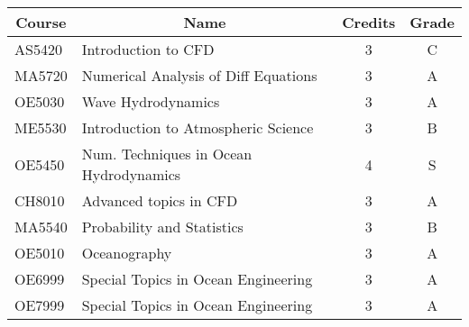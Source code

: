 \begin{tabular}{|l|l|c|c|}
\hline
\multicolumn{1}{|c|}{\textbf{Course }} & \multicolumn{1}{c|}{\textbf{Name}} & \textbf{Credits} & \textbf{Grade} \\ \hline
AS5420 & Introduction to CFD & 3 & C \\ \hline
MA5720 & Numerical Analysis of Diff Equations & 3 & A \\ \hline
OE5030 & Wave Hydrodynamics & 3 & A \\ \hline
ME5530 & Introduction to Atmospheric Science & 3 & B \\ \hline
OE5450 & Num. Techniques in Ocean Hydrodynamics & 4 & S \\ \hline
CH8010 & Advanced topics in CFD & 3 & A \\ \hline
MA5540 & Probability and Statistics & 3 & B \\ \hline
OE5010 & Oceanography & 3 & A \\ \hline
OE6999 & Special Topics in Ocean Engineering & 3 & A \\ \hline
OE7999 & Special Topics in Ocean Engineering & 3 & A \\ \hline
\end{tabular}

